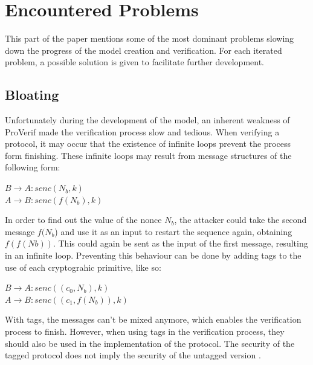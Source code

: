 \documentclass[11pt,twoside,a4paper,openright]{book}
\begin{document}

\section{Encountered Problems}

This part of the paper mentions some of the most dominant problems slowing down the progress of the model creation and verification. For each iterated problem, a possible solution is given to facilitate further development.

\subsection{Bloating}
\label{proverif_bloating}

Unfortunately during the development of the model, an inherent weakness of ProVerif made the verification process slow and tedious. When verifying a protocol, it may occur that the existence of infinite loops prevent the process form finishing. These infinite loops may result from message structures of the following form:

\begin{flushleft}
    \hspace{2cm} $B \rightarrow A : s e n c (N_b, k )$ \\
    \hspace{2cm} $A \rightarrow B : s e n c ( f (N_b ) , k )$
\end{flushleft}

In order to find out the value of the nonce $N_b$, the attacker could take the second message $f (N_b $) and use it as an input to restart the sequence again, obtaining $f ( f (Nb))$. This could again be sent as the input of the first message, resulting in an infinite loop. Preventing this behaviour can be done by adding tags to the use of each cryptograhic primitive, like so:

\begin{flushleft}
    \hspace{2cm} $B \rightarrow A : s e n c ( ( c_0 , N_b ) , k )$ \\
    \hspace{2cm} $A \rightarrow B : s e n c ( ( c_1 , f (N_b ) ) , k )$
\end{flushleft}

With tags, the messages can't be mixed anymore, which enables the verification process to finish. However, when using tags in the verification process, they should also be used in the implementation of the protocol. The security of the tagged protocol does not imply the security of the untagged version \cite{proverifManual}.
\end{document}
